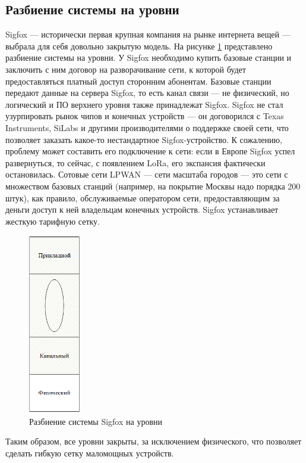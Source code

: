 \subsection{Разбиение системы на уровни}
Sigfox — исторически первая крупная компания на рынке интернета вещей — выбрала для себя довольно закрытую модель. На рисунке \ref{fig:img12} представлено разбиение системы на уровни. У Sigfox необходимо купить базовые станции и заключить с ним договор на разворачивание сети, к которой будет предоставляться платный доступ сторонним абонентам. Базовые станции передают данные на сервера Sigfox, то есть канал связи --- не физический, но логический и ПО верхнего уровня также принадлежат Sigfox. Sigfox не стал узурпировать рынок чипов и конечных устройств --- он договорился с Texas Instruments, SiLabs и другими производителями о поддержке своей сети, что позволяет заказать какое-то нестандартное Sigfox-устройство. К сожалению, проблему может составить его подключение к сети: если в Европе Sigfox успел развернуться, то сейчас, с появлением LoRa, его экспансия фактически остановилась.
Сотовые сети LPWAN --- сети масштаба городов --- это сети с множеством базовых
станций (например, на покрытие Москвы надо порядка 200 штук), как правило, обслуживаемые оператором сети, предоставляющим за деньги доступ к ней владельцам конечных устройств. Sigfox устанавливает жесткую тарифную сетку. 
\begin{figure}[H]
	\centering
	\includegraphics[width=0.2\textwidth]{img/kich_bur/12.png}
	\caption{Разбиение системы Sigfox на уровни}
	\label{fig:img12}
\end{figure}
Таким образом, все уровни закрыты, за исключением физического, что позволяет
сделать гибкую сетку маломощных устройств. 
